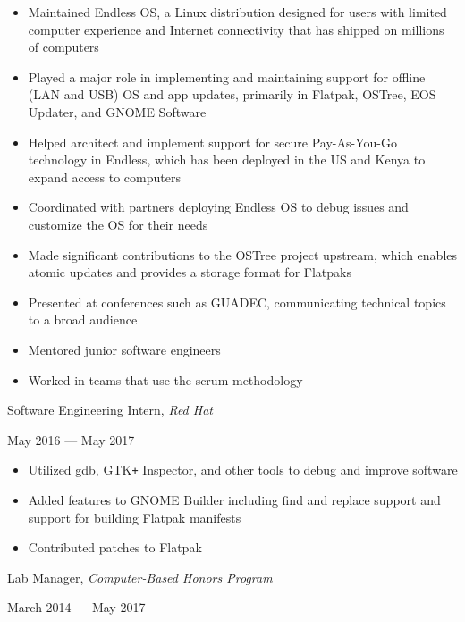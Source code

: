 \documentclass[11pt]{article}
\begin{document}
\begin{itemize}
  \item Maintained Endless OS, a Linux distribution designed for users with limited computer experience and Internet connectivity that has shipped on millions of computers
  \item Played a major role in implementing and maintaining support for offline (LAN and USB) OS and app updates, primarily in Flatpak, OSTree, EOS Updater, and GNOME Software
  \item Helped architect and implement support for secure Pay-As-You-Go technology in Endless, which has been deployed in the US and Kenya to expand access to computers
  \item Coordinated with partners deploying Endless OS to debug issues and customize the OS for their needs
  \item Made significant contributions to the OSTree project upstream, which enables atomic updates and \mbox{provides} a storage format for Flatpaks
  \item Presented at conferences such as GUADEC, communicating technical topics to a broad audience
  \item Mentored junior software engineers
  \item Worked in teams that use the scrum methodology
\end{itemize}

\newpage

\begin{minipage}[t]{0.65\textwidth}
\flushleft
Software Engineering Intern, \textit{Red Hat}\\
\end{minipage}
\begin{minipage}[t]{0.30\textwidth}
\flushright
May 2016 --- May 2017\\
\end{minipage}

\begin{itemize}
  \item Utilized gdb, GTK\texttt{+} Inspector, and other tools to debug and improve software
  \item Added features to GNOME Builder including find and replace support and support for building Flatpak manifests
  \item Contributed patches to Flatpak
\end{itemize}

\begin{minipage}[t]{0.65\textwidth}
\flushleft
Lab Manager, \textit{Computer-Based Honors Program}\\
\end{minipage}
\begin{minipage}[t]{0.30\textwidth}
\flushright
March 2014 --- May 2017\\
\end{minipage}
\end{document}
